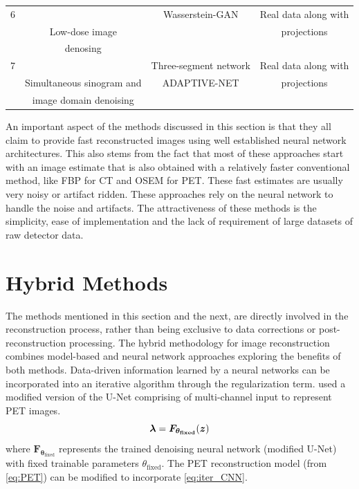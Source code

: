 \begin{table}[ht!]
\begin{tabular}{||c|c|c|c||}
		\hline
		6         & \cite{yang2018low}        &    Wasserstein-GAN & Real data along with            \\ 
		          & Low-dose image            &                    & projections                     \\ 
		          & denosing                  &                    &                                 \\ 
		\hline
		7         & \cite{zhu2020low}         &  Three-segment network  & Real data along with            \\ 
		          & Simultaneous sinogram and &  ADAPTIVE-NET      & projections                     \\ 
	 	          & image domain denoising    &                    &                                 \\ 
		\hline
		
	\end{tabular}
	
\end{table}

An important aspect of the methods discussed in this section is that they all claim to provide fast reconstructed images using well established neural network architectures. This also stems from the fact that most of these approaches start with an image estimate that is also obtained with a relatively faster conventional method, like \ac{FBP} for \ac{CT} and \ac{OSEM} for \ac{PET}. These fast estimates are usually very noisy or artifact ridden. These approaches rely on the neural network to handle the noise and artifacts. The attractiveness of these methods is the simplicity, ease of implementation and the lack of requirement of large datasets of raw detector data. 

\section{Hybrid Methods}

The methods mentioned in this section and the next, are directly involved in the reconstruction process, rather than being exclusive to data corrections or post-reconstruction processing. The hybrid methodology for image reconstruction combines model-based and neural network approaches exploring the benefits of both methods. Data-driven information learned by a neural networks can be incorporated into an iterative algorithm through the regularization term. \cite{gong2019iterative} used a modified version of the U-Net comprising of multi-channel input to represent \ac{PET} images.
\begin{equation}\label{eq:iter_CNN}
\bm{\lambda} = \bm{F}_{\bm{\theta_{\mathrm{fixed}}}}(\bm{z})
\end{equation} 
where $\bm{F}_{\bm{\theta_{\mathrm{fixed}}}}$ represents the trained denoising neural network (modified U-Net) with fixed trainable parameters $\theta_{\mathrm{fixed}}$. The \ac{PET} reconstruction model (from \ref{eq:PET}) can be modified to incorporate \ref{eq:iter_CNN}. 

